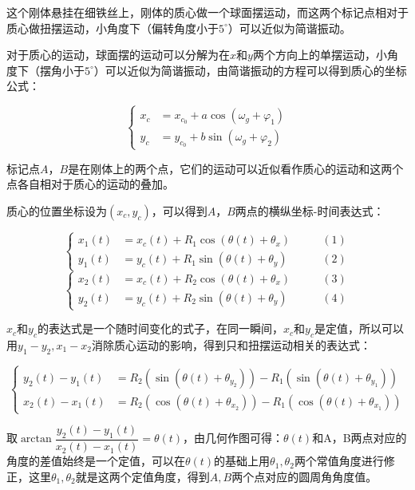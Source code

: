 \documentclass[11pt]{article}
\begin{document}
这个刚体悬挂在细铁丝上，刚体的质心做一个球面摆运动，而这两个标记点相对于质心做扭摆运动，小角度下（偏转角度小于$5^{\circ}$）可以近似为简谐振动。

对于质心的运动，球面摆的运动可以分解为在$x$和$y$两个方向上的单摆运动，小角度下（摆角小于$5^{\circ}$）可以近似为简谐振动，由简谐振动的方程可以得到质心的坐标公式：

$$\left\{
\begin{aligned}
    x_c&=x_{c_0}+a\cos(\omega_{g}+\varphi_1 ) \\
    y_c&=y_{c_0}+b\sin(\omega_{g}+\varphi_2 )
\end{aligned}
\right.$$

标记点$A$，$B$是在刚体上的两个点，它们的运动可以近似看作质心的运动和这两个点各自相对于质心的运动的叠加。

质心的位置坐标设为$(x_c,y_c)$，可以得到$A$，$B$两点的横纵坐标-时间表达式：

$$\left\{
\begin{aligned}
    x_1(t)&=x_c(t)+R_1\cos(\theta(t)+\theta_x)\qquad&(1) \\
    y_1(t)&=y_c(t)+R_1\sin(\theta(t)+\theta_y)\qquad&(2)
\end{aligned}
\right.$$
$$\left\{
\begin{aligned}
    x_2(t)&=x_c(t)+R_2\cos(\theta(t)+\theta_x)\qquad&(3) \\
    y_2(t)&=y_c(t)+R_2\sin(\theta(t)+\theta_y)\qquad&(4)
\end{aligned}
\right.$$

$x_c$和$y_c$的表达式是一个随时间变化的式子，在同一瞬间，$x_c$和$y_c$是定值，所以可以用$y_1-y_2,x_1-x_2$消除质心运动的影响，得到只和扭摆运动相关的表达式：

$$\left\{
\begin{aligned}
    y_2(t)-y_1(t)&=R_2(\sin(\theta(t)+\theta_{y_2}))-R_1(\sin(\theta(t)+\theta_{y_1})) \\
    x_2(t)-x_1(t)&=R_2(\cos(\theta(t)+\theta_{x_2}))-R_1(\cos(\theta(t)+\theta_{x_1}))
\end{aligned}
\right.$$

取$\arctan\dfrac{y_2(t)-y_1(t)}{x_2(t)-x_1(t)}=\theta(t)$，由几何作图可得：$\theta(t)$和A，B两点对应的角度的差值始终是一个定值，可以在$\theta(t)$的基础上用$\theta_1,\theta_2$两个常值角度进行修正，这里$\theta_1,\theta_2$就是这两个定值角度，得到$A,B$两个点对应的圆周角角度值。
\end{document}
